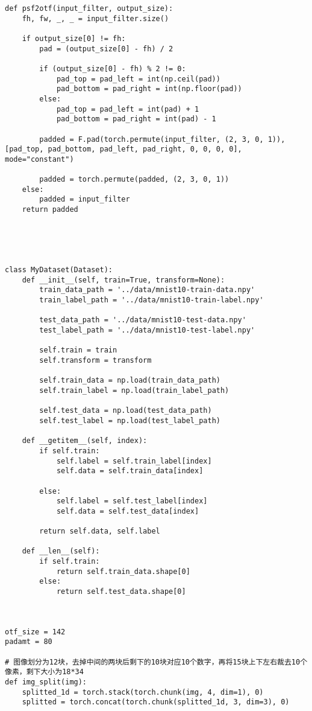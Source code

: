 \begin{lstlisting}[style=Python]
def psf2otf(input_filter, output_size):
    fh, fw, _, _ = input_filter.size()

    if output_size[0] != fh:
        pad = (output_size[0] - fh) / 2

        if (output_size[0] - fh) % 2 != 0:
            pad_top = pad_left = int(np.ceil(pad))
            pad_bottom = pad_right = int(np.floor(pad))
        else:
            pad_top = pad_left = int(pad) + 1
            pad_bottom = pad_right = int(pad) - 1

        padded = F.pad(torch.permute(input_filter, (2, 3, 0, 1)),  [pad_top, pad_bottom, pad_left, pad_right, 0, 0, 0, 0],  mode="constant")
        
        padded = torch.permute(padded, (2, 3, 0, 1))
    else:
        padded = input_filter
    return padded





class MyDataset(Dataset):
    def __init__(self, train=True, transform=None):
        train_data_path = '../data/mnist10-train-data.npy'
        train_label_path = '../data/mnist10-train-label.npy'

        test_data_path = '../data/mnist10-test-data.npy'
        test_label_path = '../data/mnist10-test-label.npy'

        self.train = train
        self.transform = transform
        
        self.train_data = np.load(train_data_path)
        self.train_label = np.load(train_label_path)

        self.test_data = np.load(test_data_path)
        self.test_label = np.load(test_label_path)

    def __getitem__(self, index):
        if self.train:
            self.label = self.train_label[index]
            self.data = self.train_data[index]

        else:
            self.label = self.test_label[index]
            self.data = self.test_data[index]
        
        return self.data, self.label
    
    def __len__(self):
        if self.train:
            return self.train_data.shape[0]
        else:
            return self.test_data.shape[0]
        


otf_size = 142
padamt = 80

# 图像划分为12块，去掉中间的两块后剩下的10块对应10个数字，再将15块上下左右裁去10个像素，剩下大小为18*34
def img_split(img):
    splitted_1d = torch.stack(torch.chunk(img, 4, dim=1), 0)
    splitted = torch.concat(torch.chunk(splitted_1d, 3, dim=3), 0)
    

\end{lstlisting}

